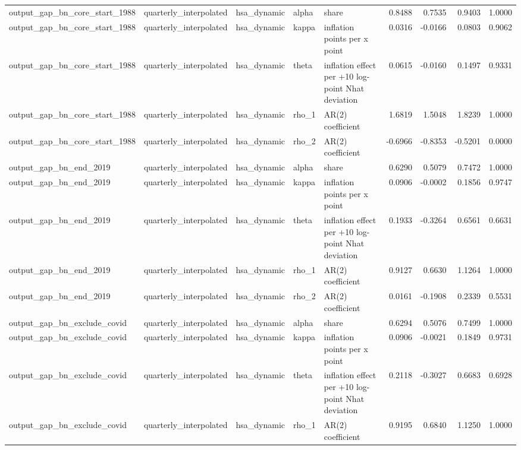 \begin{tabular}{lllllrrrr}
output\_gap\_bn\_core\_start\_1988 & quarterly\_interpolated & hsa\_dynamic & alpha & share & 0.8488 & 0.7535 & 0.9403 & 1.0000 \\
output\_gap\_bn\_core\_start\_1988 & quarterly\_interpolated & hsa\_dynamic & kappa & inflation points per x point & 0.0316 & -0.0166 & 0.0803 & 0.9062 \\
output\_gap\_bn\_core\_start\_1988 & quarterly\_interpolated & hsa\_dynamic & theta & inflation effect per +10 log-point Nhat deviation & 0.0615 & -0.0160 & 0.1497 & 0.9331 \\
output\_gap\_bn\_core\_start\_1988 & quarterly\_interpolated & hsa\_dynamic & rho\_1 & AR(2) coefficient & 1.6819 & 1.5048 & 1.8239 & 1.0000 \\
output\_gap\_bn\_core\_start\_1988 & quarterly\_interpolated & hsa\_dynamic & rho\_2 & AR(2) coefficient & -0.6966 & -0.8353 & -0.5201 & 0.0000 \\
output\_gap\_bn\_end\_2019 & quarterly\_interpolated & hsa\_dynamic & alpha & share & 0.6290 & 0.5079 & 0.7472 & 1.0000 \\
output\_gap\_bn\_end\_2019 & quarterly\_interpolated & hsa\_dynamic & kappa & inflation points per x point & 0.0906 & -0.0002 & 0.1856 & 0.9747 \\
output\_gap\_bn\_end\_2019 & quarterly\_interpolated & hsa\_dynamic & theta & inflation effect per +10 log-point Nhat deviation & 0.1933 & -0.3264 & 0.6561 & 0.6631 \\
output\_gap\_bn\_end\_2019 & quarterly\_interpolated & hsa\_dynamic & rho\_1 & AR(2) coefficient & 0.9127 & 0.6630 & 1.1264 & 1.0000 \\
output\_gap\_bn\_end\_2019 & quarterly\_interpolated & hsa\_dynamic & rho\_2 & AR(2) coefficient & 0.0161 & -0.1908 & 0.2339 & 0.5531 \\
output\_gap\_bn\_exclude\_covid & quarterly\_interpolated & hsa\_dynamic & alpha & share & 0.6294 & 0.5076 & 0.7499 & 1.0000 \\
output\_gap\_bn\_exclude\_covid & quarterly\_interpolated & hsa\_dynamic & kappa & inflation points per x point & 0.0906 & -0.0021 & 0.1849 & 0.9731 \\
output\_gap\_bn\_exclude\_covid & quarterly\_interpolated & hsa\_dynamic & theta & inflation effect per +10 log-point Nhat deviation & 0.2118 & -0.3027 & 0.6683 & 0.6928 \\
output\_gap\_bn\_exclude\_covid & quarterly\_interpolated & hsa\_dynamic & rho\_1 & AR(2) coefficient & 0.9195 & 0.6840 & 1.1250 & 1.0000 \\

\end{tabular}
